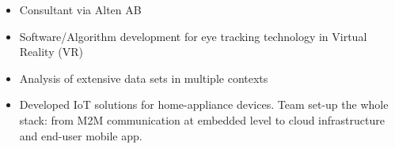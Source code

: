 \documentclass[10pt,a4paper,ragged2e,withhyper]{altacv}
\begin{document}

\begin{fullwidth}
\makecvheader
\end{fullwidth}


\vspace{-6mm}

\begin{itemize}
\item Consultant via Alten AB
\item Software/Algorithm development for eye tracking technology in Virtual Reality (VR)
\item Analysis of extensive data sets in multiple contexts%
\end{itemize}

\smallskip

\begin{itemize}
\item Developed IoT solutions for home-appliance devices. Team set-up the whole stack: from M2M communication at embedded level to cloud infrastructure and end-user mobile app.
\end{itemize}
\end{document}
